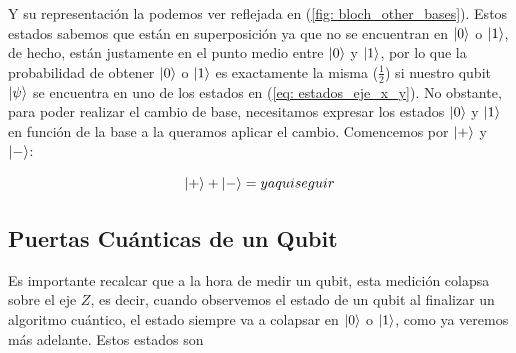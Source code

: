 \documentclass{article}
\numberwithin{equation}{section} %
\begin{document}
    \vspace{2.5mm}

    Y su representación la podemos ver reflejada en (\ref{fig: bloch_other_bases}). Estos estados sabemos que están en superposición ya que no se encuentran en \( \ket{0} \) o \( \ket{1} \), de hecho, están justamente en el punto medio entre \( \ket{0} \) y \( \ket{1} \), por lo que la probabilidad de obtener \( \ket{0} \) o \( \ket{1} \) es exactamente la misma (\( \frac{1}{2} \)) si nuestro qubit \( \ket{\psi} \) se encuentra en uno de los estados en (\ref{eq: estados_eje_x_y}). No obstante, para poder realizar el cambio de base, necesitamos expresar los estados \( \ket{0} \) y \( \ket{1} \) en función de la base a la queramos aplicar el cambio. Comencemos por \( \ket{+} \) y \( \ket{-} \):

    \begin{equation*}
        \ket{+} + \ket{-} = y aqui seguir 
    \end{equation*}




    \vspace{10mm}





    \subsection{Puertas Cuánticas de un Qubit}

    \vspace{5mm}











    
    Es importante recalcar que a la hora de medir un qubit, esta medición colapsa sobre el eje \( Z \), es decir, cuando observemos el estado de un qubit al finalizar un algoritmo cuántico, el estado siempre va a colapsar en \( \ket{0} \) o \( \ket{1} \), como ya veremos más adelante. Estos estados son
\end{document}
